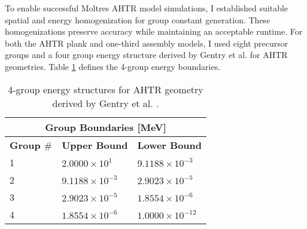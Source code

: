 To enable successful Moltres \gls{AHTR} model simulations, I established suitable 
spatial and energy homogenization for group constant generation. 
These homogenizations preserve accuracy while maintaining an acceptable runtime.
For both the \gls{AHTR} plank and one-third assembly models, I used eight precursor 
groups and a four group energy structure derived by Gentry et al. 
\cite{gentry_development_2016} for \gls{AHTR} geometries. 
Table \ref{tab:energy_structures} defines the 4-group energy boundaries. 
\begin{table}[htbp]
    \centering
    \onehalfspacing
    \caption{4-group energy structures for \acrfull{AHTR} geometry 
    derived by Gentry et al. \cite{gentry_development_2016}.}
	\label{tab:energy_structures}
    \footnotesize
    \begin{tabular}{lll}
    \hline
    \multicolumn{3}{c}{\textbf{Group Boundaries [MeV]}} \\ 
    \hline
    \textbf{Group $\#$}& \textbf{Upper Bound} & \textbf{Lower Bound}  \\
    \hline 
    1 & $2.0000\times 10^1$ & $9.1188\times 10^{-3}$ \\ 
    2 & $9.1188\times 10^{-3}$ & $2.9023\times 10^{-5}$\\
    3 & $2.9023\times 10^{-5}$ & $1.8554\times 10^{-6}$\\
    4 & $1.8554\times 10^{-6}$ & $1.0000\times 10^{-12}$\\
    \hline
    \end{tabular}
\end{table}

